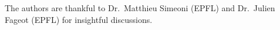 \begin{ack}

The authors are thankful to Dr.\ Matthieu Simeoni (EPFL) and Dr.\ Julien Fageot (EPFL) for insightful discussions.

\end{ack}
